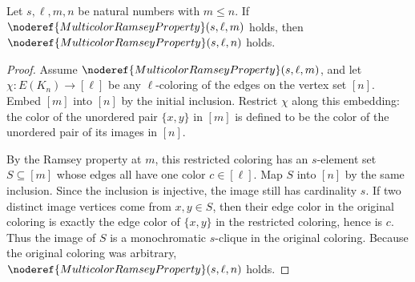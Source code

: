 \begin{helper}
Let \(s,\ell,m,n\) be natural numbers with \(m\le n\).  If
\(\noderef{MulticolorRamseyProperty}(s,\ell,m)\) holds, then
\(\noderef{MulticolorRamseyProperty}(s,\ell,n)\) holds.
\end{helper}
\begin{proof}
Assume \(\noderef{MulticolorRamseyProperty}(s,\ell,m)\), and let
\(\chi:E(K_n)\to[\ell]\) be any \(\ell\)-coloring of the edges on the vertex
set \([n]\).  Embed \([m]\) into \([n]\) by the initial inclusion.  Restrict
\(\chi\) along this embedding: the color of the unordered pair \(\{x,y\}\) in
\([m]\) is defined to be the color of the unordered pair of its images in
\([n]\).

By the Ramsey property at \(m\), this restricted coloring has an \(s\)-element
set \(S\subseteq[m]\) whose edges all have one color \(c\in[\ell]\).  Map
\(S\) into \([n]\) by the same inclusion.  Since the inclusion is injective,
the image still has cardinality \(s\).  If two distinct image vertices come
from \(x,y\in S\), then their edge color in the original coloring is exactly
the edge color of \(\{x,y\}\) in the restricted coloring, hence is \(c\).
Thus the image of \(S\) is a monochromatic \(s\)-clique in the original
coloring.  Because the original coloring was arbitrary,
\(\noderef{MulticolorRamseyProperty}(s,\ell,n)\) holds.
\end{proof}

